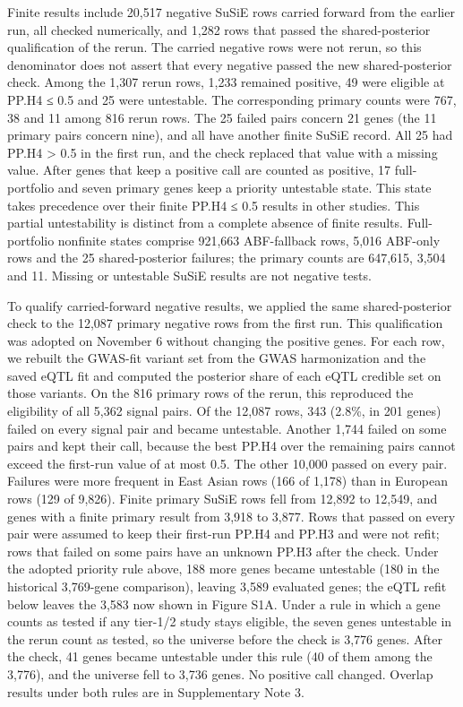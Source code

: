 Finite results include 20,517 negative SuSiE rows carried forward from the earlier run, all checked numerically, and 1,282 rows that passed the shared-posterior qualification of the rerun. The carried negative rows were not rerun, so this denominator does not assert that every negative passed the new shared-posterior check. Among the 1,307 rerun rows, 1,233 remained positive, 49 were eligible at PP.H4 ≤ 0.5 and 25 were untestable. The corresponding primary counts were 767, 38 and 11 among 816 rerun rows. The 25 failed pairs concern 21 genes (the 11 primary pairs concern nine), and all have another finite SuSiE record. All 25 had PP.H4 \textgreater{} 0.5 in the first run, and the check replaced that value with a missing value. After genes that keep a positive call are counted as positive, 17 full-portfolio and seven primary genes keep a priority untestable state. This state takes precedence over their finite PP.H4 ≤ 0.5 results in other studies. This partial untestability is distinct from a complete absence of finite results. Full-portfolio nonfinite states comprise 921,663 ABF-fallback rows, 5,016 ABF-only rows and the 25 shared-posterior failures; the primary counts are 647,615, 3,504 and 11. Missing or untestable SuSiE results are not negative tests.

To qualify carried-forward negative results, we applied the same shared-posterior check to the 12,087 primary negative rows from the first run. This qualification was adopted on November 6 without changing the positive genes. For each row, we rebuilt the GWAS-fit variant set from the GWAS harmonization and the saved eQTL fit and computed the posterior share of each eQTL credible set on those variants. On the 816 primary rows of the rerun, this reproduced the eligibility of all 5,362 signal pairs. Of the 12,087 rows, 343 (2.8\%, in 201 genes) failed on every signal pair and became untestable. Another 1,744 failed on some pairs and kept their call, because the best PP.H4 over the remaining pairs cannot exceed the first-run value of at most 0.5. The other 10,000 passed on every pair. Failures were more frequent in East Asian rows (166 of 1,178) than in European rows (129 of 9,826). Finite primary SuSiE rows fell from 12,892 to 12,549, and genes with a finite primary result from 3,918 to 3,877. Rows that passed on every pair were assumed to keep their first-run PP.H4 and PP.H3 and were not refit; rows that failed on some pairs have an unknown PP.H3 after the check. Under the adopted priority rule above, 188 more genes became untestable (180 in the historical 3,769-gene comparison), leaving 3,589 evaluated genes; the eQTL refit below leaves the 3,583 now shown in Figure S1A. Under a rule in which a gene counts as tested if any tier-1/2 study stays eligible, the seven genes untestable in the rerun count as tested, so the universe before the check is 3,776 genes. After the check, 41 genes became untestable under this rule (40 of them among the 3,776), and the universe fell to 3,736 genes. No positive call changed. Overlap results under both rules are in Supplementary Note 3.

